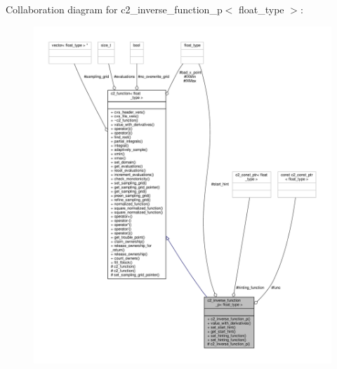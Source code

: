 Collaboration diagram for c2\+\_\+inverse\+\_\+function\+\_\+p$<$ float\+\_\+type $>$\+:
\nopagebreak
\begin{figure}[H]
\begin{center}
\leavevmode
\includegraphics[width=350pt]{classc2__inverse__function__p__coll__graph}
\end{center}
\end{figure}
